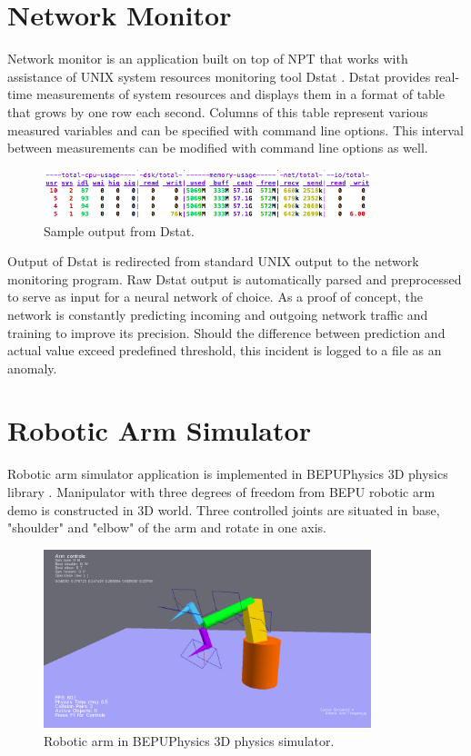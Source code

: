 \documentclass[12pt,oneside]{fithesis2}
\begin{document}
\section{Network Monitor}
Network monitor is an application built on top of NPT that works with assistance of UNIX system resources monitoring tool Dstat \cite{dstat}. Dstat provides real-time measurements of system resources and displays them in a format of table that grows by one row each second. Columns of this table represent various measured variables and can be specified with command line options. This interval between measurements can be modified with command line options as well. \par

\begin{figure}[H]
	\centering
	\includegraphics[width=360px]{dstat_sample.png}
	\caption{Sample output from Dstat.}
\end{figure}

Output of Dstat is redirected from standard UNIX output to the network monitoring program. Raw Dstat output is automatically parsed and preprocessed to serve as input for a neural network of choice. As a proof of concept, the network is constantly predicting incoming and outgoing network traffic and training to improve its precision. Should the difference between prediction and actual value exceed predefined threshold, this incident is logged to a file as an anomaly.

\section{Robotic Arm Simulator}
Robotic arm simulator application is implemented in BEPUPhysics 3D physics library \cite{bepuphysics}. Manipulator with three degrees of freedom from BEPU robotic arm demo \cite{bepu-robotarm-demo} is constructed in 3D world. Three controlled joints are situated in base, "shoulder" and "elbow" of the arm and rotate in one axis.\par

	\begin{figure}[ht]
		\centering
		\includegraphics[width=360px]{roboticarm.png}
		\caption{Robotic arm in BEPUPhysics 3D physics simulator.}
	\end{figure}
\end{document}
